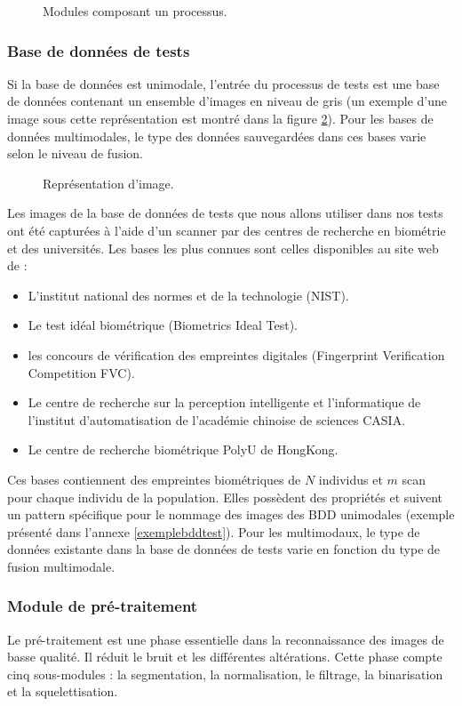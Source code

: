 \begin{figure}[H]
	\centering
	\caption{Modules composant un processus.}
	\label{process}
\end{figure}
\subsubsection{Base de données de tests }
Si la base de données est unimodale, l’entrée du processus de tests est une base de données contenant un ensemble d’images en niveau de gris (un exemple d’une image sous cette représentation est montré dans la figure \ref{imagenum}). Pour les bases de données multimodales, le type des données sauvegardées dans ces bases varie selon le niveau de fusion. 

\begin{figure}[H]
	\centering
	\caption{Représentation d’image.}
	\label{imagenum}
\end{figure}
Les images de la base de données de tests que nous allons utiliser dans nos tests ont été capturées à l’aide d’un scanner par des centres de recherche en biométrie et des universités. Les bases les plus connues sont celles disponibles au site web de :
\begin{itemize}
	\item L'institut national des normes et de la technologie (NIST).
	\item Le test idéal biométrique (Biometrics Ideal Test).
	\item les concours de vérification des empreintes digitales (Fingerprint Verification Competition FVC).
	\item Le centre de recherche sur la perception intelligente et l'informatique de l’institut d'automatisation de l’académie chinoise de sciences CASIA.
	\item Le centre de recherche biométrique PolyU de HongKong.
\end{itemize}
Ces bases contiennent des empreintes biométriques de $N$ individus et $m$ scan pour chaque individu de la population. Elles possèdent des propriétés et suivent un pattern spécifique pour le nommage des images des BDD unimodales (exemple présenté dans l'annexe \ref{exemplebddtest}). Pour les multimodaux, le type de données existante dans la base de données de tests varie en fonction du type de fusion multimodale.
\subsubsection{Module de pré-traitement}
Le pré-traitement est une phase essentielle dans la reconnaissance des images de basse qualité. Il réduit le bruit et les différentes altérations. Cette phase compte cinq sous-modules : la segmentation, la normalisation, le filtrage, la binarisation et la squelettisation.

